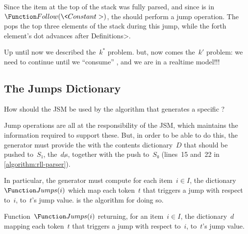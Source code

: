 Since the item at the top of the stack was fully parsed, and since 
  is in $\Function Follow(\<Constant>)$, the \RLLp should perform a
 jump operation.
The \RLLp pops the top three elements of the stack during this jump, while the
forth element's dot advances after \<Definitions>.

Up until now we described the~$k^*$ problem. 
but, now comes the~$k'$ problem: we need to continue until we ``consume'' ,
and we are in a realtime model!!!







\subsection{The Jumps Dictionary}
How should the JSM be used by the algorithm that generates
a specific \RLLp?

Jump operations are all at the responsibility of the JSM,
which maintains the information required to support these.
But, in order to be able to do this, the generator must
provide the \RLLp with the contents dictionary~$D$ that should be pushed
to~$S₁$, the~$dᵢ$s, together with the push to~$S₀$ (lines~15 and~22 in
\cref{algorithm:rll-parser}).

In particular, the \RLLp generator must compute for each
item~$i∈I$, the dictionary~$\Function Jumps(i)$ which
map each token~$t$ that triggers a jump with
respect to~$i$, to~$t$'s jump value.
 is the algorithm for doing so.

\begin{algorithm}
  \begin{algorithmic}
  \caption{\label{algorithm:coordination}
    Function~$\Function Jumps(i)$ returning, for an item~$i∈I$,
  the dictionary~$d$ mapping each token~$t$ that
    triggers a jump with respect to~$i$, to~$t$'s jump value.
  }
   
   
      \BREAK
    \FI
       
      \FI
    \ENDFOR %
  \ENDFOR
  \end{algorithmic}
\end{algorithm}

